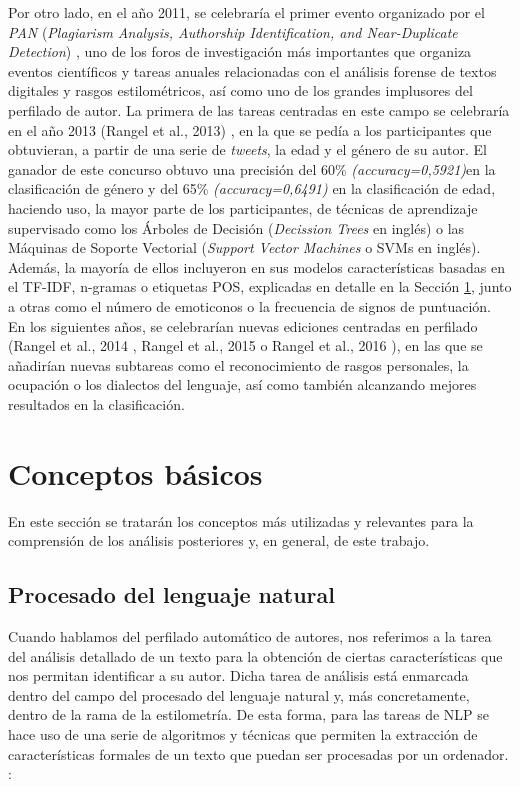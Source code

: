 \bigskip
Por otro lado, en el año 2011, se celebraría el primer evento organizado por el \textit{PAN} (\textit{Plagiarism Analysis, Authorship Identification, and Near-Duplicate Detection}) \cite{pan},
uno de los foros de investigación más importantes que organiza eventos científicos y tareas anuales relacionadas con el análisis forense de textos digitales
y rasgos estilométricos, así como uno de los grandes implusores del perfilado de autor. La primera de las tareas centradas en este campo se celebraría en el año 2013 (Rangel et al., 2013) \cite{rangel2013overview},
en la que se pedía a los participantes que obtuvieran, a partir de una serie de \textit{tweets}, la edad y el género de su autor. El ganador de este concurso obtuvo una
precisión del 60\% \textit{(accuracy=0,5921)}en la clasificación de género y del 65\% \textit{(accuracy=0,6491)} en la clasificación de edad, haciendo uso, la mayor parte de los participantes, de técnicas de aprendizaje
supervisado como los Árboles de Decisión (\textit{Decission Trees} en inglés) o las Máquinas de Soporte Vectorial (\textit{Support Vector Machines} o SVMs en inglés).
Además, la mayoría de ellos incluyeron en sus modelos características basadas en el TF-IDF, n-gramas o etiquetas POS, explicadas en detalle en la Sección \ref{sec:conceptos_basicos},
junto a otras como el número de emoticonos o la frecuencia de signos de puntuación.
En los siguientes años, se celebrarían nuevas ediciones centradas en perfilado (Rangel et al., 2014 \cite{rangel2014overview}, Rangel et al., 2015 \cite{rangel2015overview} o
Rangel et al., 2016 \cite{rangel2016overview}), en las que se añadirían nuevas subtareas como el reconocimiento de rasgos personales, la ocupación o los dialectos del lenguaje,
así como también alcanzando mejores resultados en la clasificación.

\section{Conceptos básicos}
\label{sec:conceptos_basicos}

En este sección se tratarán los conceptos más utilizadas y relevantes para la comprensión de los análisis posteriores y, en general, de este trabajo.

\subsection{Procesado del lenguaje natural}
\label{sec:procesado_lenguaje_natural}

Cuando hablamos del perfilado automático de autores, nos referimos a la tarea del análisis detallado de un texto para la obtención de ciertas características
que nos permitan identificar a su autor.
Dicha tarea de análisis está enmarcada dentro del campo del procesado del lenguaje natural y, más concretamente,
dentro de la rama de la estilometría. De esta forma, para las tareas de NLP se hace uso
de una serie de algoritmos y técnicas que permiten la extracción de características formales de un texto que puedan
ser procesadas por un ordenador. :

